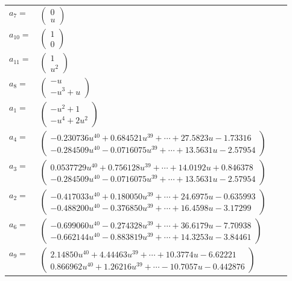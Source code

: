 \documentclass[1p]{elsarticle_modified}
\theoremstyle{definition}
\begin{document}
\begin{tabular}{m{7pt} m{180pt} m{7pt} m{180pt} }
\flushright $a_{7}=$&$\begin{pmatrix}0\\u\end{pmatrix}$ \\
\flushright $a_{10}=$&$\begin{pmatrix}1\\0\end{pmatrix}$ \\
\flushright $a_{11}=$&$\begin{pmatrix}1\\u^2\end{pmatrix}$ \\
\flushright $a_{8}=$&$\begin{pmatrix}- u\\- u^3+u\end{pmatrix}$ \\
\flushright $a_{1}=$&$\begin{pmatrix}- u^2+1\\- u^4+2 u^2\end{pmatrix}$ \\
\flushright $a_{4}=$&$\begin{pmatrix}-0.230736 u^{40}+0.684521 u^{39}+\cdots+27.5823 u-1.73316\\-0.284509 u^{40}-0.0716075 u^{39}+\cdots+13.5631 u-2.57954\end{pmatrix}$ \\
\flushright $a_{3}=$&$\begin{pmatrix}0.0537729 u^{40}+0.756128 u^{39}+\cdots+14.0192 u+0.846378\\-0.284509 u^{40}-0.0716075 u^{39}+\cdots+13.5631 u-2.57954\end{pmatrix}$ \\
\flushright $a_{2}=$&$\begin{pmatrix}-0.417033 u^{40}+0.180050 u^{39}+\cdots+24.6975 u-0.635993\\-0.488200 u^{40}-0.376850 u^{39}+\cdots+16.4598 u-3.17299\end{pmatrix}$ \\
\flushright $a_{6}=$&$\begin{pmatrix}-0.699060 u^{40}-0.274328 u^{39}+\cdots+36.6179 u-7.70938\\-0.662144 u^{40}-0.883819 u^{39}+\cdots+14.3253 u-3.84461\end{pmatrix}$ \\
\flushright $a_{9}=$&$\begin{pmatrix}2.14850 u^{40}+4.44463 u^{39}+\cdots+10.3774 u-6.62221\\0.866962 u^{40}+1.26216 u^{39}+\cdots-10.7057 u-0.442876\end{pmatrix}$ \\

\end{tabular}
\end{document}
